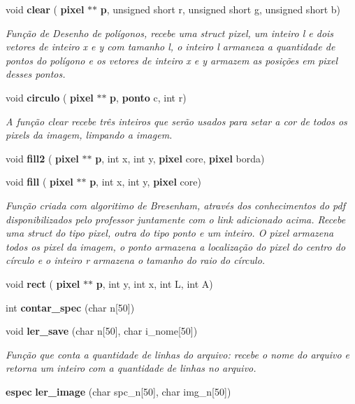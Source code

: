 \begin{DoxyCompactItemize}
void \textbf{ clear} (\textbf{ pixel} $\ast$$\ast$\textbf{ p}, unsigned short r, unsigned short g, unsigned short b)
\begin{DoxyCompactList}\small\item\em Função de Desenho de polígonos, recebe uma struct pixel, um inteiro l e dois vetores de inteiro x e y com tamanho l, o inteiro l armaneza a quantidade de pontos do polígono e os vetores de inteiro x e y armazem as posições em pixel desses pontos. \end{DoxyCompactList}\item 
void \textbf{ circulo} (\textbf{ pixel} $\ast$$\ast$\textbf{ p}, \textbf{ ponto} c, int r)
\begin{DoxyCompactList}\small\item\em A função clear recebe três inteiros que serão usados para setar a cor de todos os pixels da imagem, limpando a imagem. \end{DoxyCompactList}\item 
void \textbf{ fill2} (\textbf{ pixel} $\ast$$\ast$\textbf{ p}, int x, int y, \textbf{ pixel} core, \textbf{ pixel} borda)
\item 
void \textbf{ fill} (\textbf{ pixel} $\ast$$\ast$\textbf{ p}, int x, int y, \textbf{ pixel} core)
\begin{DoxyCompactList}\small\item\em Função criada com algoritimo de Bresenham, através dos conhecimentos do pdf disponibilizados pelo professor juntamente com o link adicionado acima. Recebe uma struct do tipo pixel, outra do tipo ponto e um inteiro. O pixel armazena todos os pixel da imagem, o ponto armazena a localização do pixel do centro do círculo e o inteiro r armazena o tamanho do raio do círculo. \end{DoxyCompactList}\item 
void \textbf{ rect} (\textbf{ pixel} $\ast$$\ast$\textbf{ p}, int y, int x, int L, int A)
\item 
int \textbf{ contar\+\_\+spec} (char n[50])
\item 
void \textbf{ ler\+\_\+save} (char n[50], char i\+\_\+nome[50])
\begin{DoxyCompactList}\small\item\em Função que conta a quantidade de linhas do arquivo\+: recebe o nome do arquivo e retorna um inteiro com a quantidade de linhas no arquivo. \end{DoxyCompactList}\item 
\textbf{ espec} \textbf{ ler\+\_\+image} (char spc\+\_\+n[50], char img\+\_\+n[50])
$$
\end{DoxyCompactItemize}
